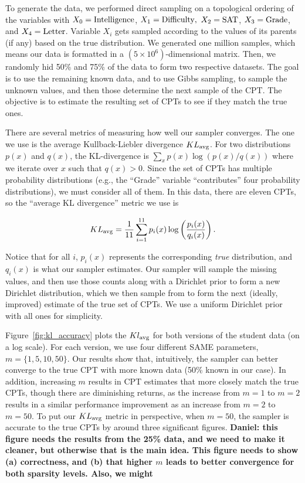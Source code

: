 \documentclass{article} %
\begin{document}
To generate the data, we performed direct sampling on a topological ordering of the variables with
$X_0 = {\rm Intelligence}$, $X_1 = {\rm Difficulty},$ $X_2 = {\rm SAT}$, $X_3 = {\rm Grade}$, and
$X_4 = {\rm Letter}$. Variable $X_i$ gets sampled according to the values of its parents (if any)
based on the true distribution. We generated one million samples, which means our data is formatted
in a $(5\times 10^6)$-dimensional matrix. Then, we randomly hid 50\% and 75\% of the data to form
two respective datasets. The goal is to use the remaining known data, and to use Gibbs sampling, to
sample the unknown values, and then those determine the next sample of the CPT. The objective is to
estimate the resulting set of CPTs to see if they match the true ones.

There are several metrics of measuring how well our sampler converges. The one we use is the average
Kullback-Liebler divergence $KL_{\rm avg}$. For two distributions $p(x)$ and $q(x)$, the
KL-divergence is $\sum_x p(x) \log(p(x)/q(x))$ where we iterate over $x$ such that $q(x) > 0$. Since
the set of CPTs has multiple probability distributions (e.g., the ``Grade'' variable ``contributes''
four probability distributions), we must consider all of them. In this data, there are eleven CPTs,
so the ``average KL divergence'' metric we use is

\begin{equation}\label{eq:avg_kl}
KL_{\rm avg} = \frac{1}{11}\sum_{i=1}^{11} p_i(x) \log\left(\frac{p_i(x)}{q_i(x)}\right).
\end{equation}

Notice that for all $i$, $p_i(x)$ represents the corresponding \emph{true} distribution, and
$q_i(x)$ is what our sampler estimates. Our sampler will sample the missing values, and then use
those counts along with a Dirichlet prior to form a new Dirichlet distribution, which we then sample
from to form the next (ideally, improved) estimate of the true set of CPTs. We use a uniform
Dirichlet prior with all ones for simplicity.

Figure~\ref{fig:kl_accuracy} plots the $Kl_{\rm avg}$ for both versions of the student data (on a log
scale). For each version, we use four different SAME parameters, $m = \{1,5,10,50\}$. Our results
show that, intuitively, the sampler can better converge to the true CPT with more known data (50\%
known in our case). In addition, increasing $m$ results in CPT estimates that more closely match the
true CPTs, though there are diminishing returns, as the increase from $m=1$ to $m=2$ results in a
similar performance improvement as an increase from $m=2$ to $m=50$. To put our $KL_{\rm avg}$
metric in perspective, when $m=50$, the sampler is accurate to the true CPTs by around three
significant figures. \textbf{Daniel: this figure needs the results from the 25\% data, and we need to
make it cleaner, but otherwise that is the main idea. This figure needs to show (a) correctness, and
(b) that higher $m$ leads to better convergence for both sparsity levels. Also, we might}
\end{document}
